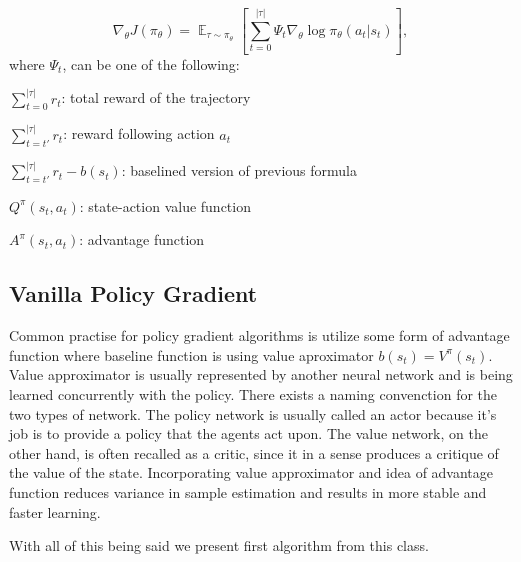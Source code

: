 \[
  \nabla_\theta J(\pi_\theta) = \mathop{\mathbb{E}}_{\tau \sim \pi_\theta}\left[\sum_{t=0}^{|\tau|} \Psi_t \nabla_\theta \log \pi_\theta(a_t|s_t)\right],
\]
where $\Psi_t$, can be one of the following:
\begin{list}{}{}
  \item $\sum_{t=0}^{|\tau|} r_t$: total reward of the trajectory
  \item $\sum_{t=t'}^{|\tau|} r_t$: reward following action $a_t$
  \item $\sum_{t=t'}^{|\tau|} r_t - b(s_t)$: baselined version of previous formula
  \item $Q^\pi(s_t,a_t)$: state-action value function
  \item $A^\pi(s_t,a_t)$: advantage function
\end{list}

\subsection{Vanilla Policy Gradient}
Common practise for policy gradient algorithms is utilize some form of advantage function where baseline function is using value aproximator $b(s_t) = V^\pi(s_t)$.
Value approximator is usually represented by another neural network and is being learned concurrently with the policy.
There exists a naming convenction for the two types of network.
The policy network is usually called an actor because it's job is to provide a policy that the agents act upon.
The value network, on the other hand, is often recalled as a critic, since it in a sense produces a critique of the value of the state.
Incorporating value approximator and idea of advantage function reduces variance in sample estimation and results in more stable and faster learning.

With all of this being said we present first algorithm from this class.

